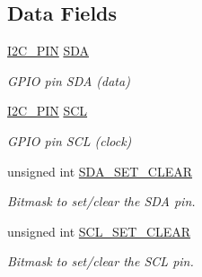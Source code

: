 \subsection*{Data Fields}
\begin{DoxyCompactItemize}
\item 
\hypertarget{struct_i2_c___p_o_r_t_a5db08703c6bffc8ba01abce83b395c09}{}\hyperlink{struct_i2_c___p_i_n}{I2\+C\+\_\+\+P\+I\+N} \hyperlink{struct_i2_c___p_o_r_t_a5db08703c6bffc8ba01abce83b395c09}{S\+D\+A}\label{struct_i2_c___p_o_r_t_a5db08703c6bffc8ba01abce83b395c09}

\begin{DoxyCompactList}\small\item\em G\+P\+I\+O pin S\+D\+A (data) \end{DoxyCompactList}\item 
\hypertarget{struct_i2_c___p_o_r_t_a3c5f51354f7ba68c87911ba09adbe894}{}\hyperlink{struct_i2_c___p_i_n}{I2\+C\+\_\+\+P\+I\+N} \hyperlink{struct_i2_c___p_o_r_t_a3c5f51354f7ba68c87911ba09adbe894}{S\+C\+L}\label{struct_i2_c___p_o_r_t_a3c5f51354f7ba68c87911ba09adbe894}

\begin{DoxyCompactList}\small\item\em G\+P\+I\+O pin S\+C\+L (clock) \end{DoxyCompactList}\item 
\hypertarget{struct_i2_c___p_o_r_t_a8ae00c1e6b29ac2fdd64b0d43a7b5d23}{}unsigned int \hyperlink{struct_i2_c___p_o_r_t_a8ae00c1e6b29ac2fdd64b0d43a7b5d23}{S\+D\+A\+\_\+\+S\+E\+T\+\_\+\+C\+L\+E\+A\+R}\label{struct_i2_c___p_o_r_t_a8ae00c1e6b29ac2fdd64b0d43a7b5d23}

\begin{DoxyCompactList}\small\item\em Bitmask to set/clear the S\+D\+A pin. \end{DoxyCompactList}\item 
\hypertarget{struct_i2_c___p_o_r_t_ad4f6c7bbbb94ba99eef86f696276124b}{}unsigned int \hyperlink{struct_i2_c___p_o_r_t_ad4f6c7bbbb94ba99eef86f696276124b}{S\+C\+L\+\_\+\+S\+E\+T\+\_\+\+C\+L\+E\+A\+R}\label{struct_i2_c___p_o_r_t_ad4f6c7bbbb94ba99eef86f696276124b}

\begin{DoxyCompactList}\small\item\em Bitmask to set/clear the S\+C\+L pin. \end{DoxyCompactList}\end{DoxyCompactItemize}


